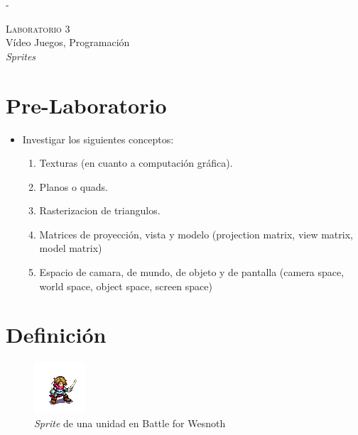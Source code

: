 -\begin{center}
\textsc{\Large Laboratorio 3}~\\
{\large Vídeo Juegos, Programación}~\\
\emph{Sprites}
\end{center}

\section{Pre-Laboratorio}
\begin{itemize}
\item Investigar los siguientes conceptos:
\begin{enumerate}
  \item Texturas (en cuanto a computación gráfica).
  \item Planos o quads.
  \item Rasterizacion de triangulos.
  \item Matrices de proyección, vista y modelo (projection matrix, view matrix, model matrix)
  \item Espacio de camara, de mundo, de objeto y de pantalla (camera space, world space, object space, screen space)
\end{enumerate}
\end{itemize}
\section{Definición}
\setlength\intextsep{0pt}
\begin{figure}
\includegraphics[width=\linewidth]{semana3/sprite_ej1.png} 
\caption{\emph{Sprite} de una unidad en Battle for Wesnoth \cite{wesnothgame}}
\end{figure}

